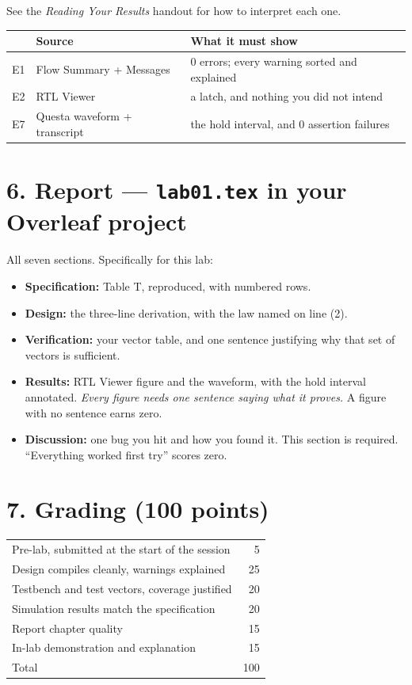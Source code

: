 \documentclass[11pt]{article}
\newcommand{\code}[1]{\texttt{#1}}
\begin{document}
See the \emph{Reading Your Results} handout for how to interpret each one.

\begin{center}
\begin{tabular}{lll}
\toprule
& Source & What it must show \\
\midrule
E1 & Flow Summary + Messages & 0 errors; every warning sorted and explained \\
E2 & RTL Viewer & a latch, and nothing you did not intend \\
E7 & Questa waveform + transcript & the hold interval, and 0 assertion failures \\
\bottomrule
\end{tabular}
\end{center}

\section*{6. Report --- \code{lab01.tex} in your Overleaf project}

All seven sections. Specifically for this lab:

\begin{itemize}[leftmargin=1.6em,itemsep=1pt]
\item \textbf{Specification:} Table T, reproduced, with numbered rows.
\item \textbf{Design:} the three-line derivation, with the law named on line (2).
\item \textbf{Verification:} your vector table, and one sentence justifying why
that set of vectors is sufficient.
\item \textbf{Results:} RTL Viewer figure and the waveform, with the hold interval
annotated. \emph{Every figure needs one sentence saying what it proves.} A figure
with no sentence earns zero.
\item \textbf{Discussion:} one bug you hit and how you found it. This section is
required. ``Everything worked first try'' scores zero.
\end{itemize}

\section*{7. Grading (100 points)}

\begin{center}
\begin{tabular}{lr}
\toprule
Pre-lab, submitted at the start of the session & 5 \\
Design compiles cleanly, warnings explained & 25 \\
Testbench and test vectors, coverage justified & 20 \\
Simulation results match the specification & 20 \\
Report chapter quality & 15 \\
In-lab demonstration and explanation & 15 \\
\midrule
Total & 100 \\
\bottomrule
\end{tabular}
\end{center}
\end{document}
